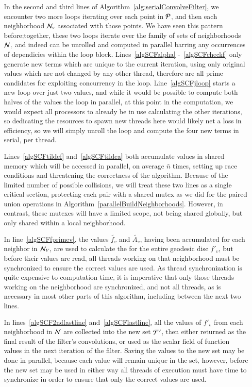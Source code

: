 In the second and third lines of Algorithm~\ref{alg:serialConvolveFilter}, we encounter two more loops iterating over each point in $\mathcal{P}$, and then each neighborhood $\mathcal{N}_v$ associated with those points. We have seen this pattern before;together, these two loops iterate over the family of sets of neighborhoods $\mathcal{N}$, and indeed can be unrolled and computed in parallel barring any occurrences of dependicies within the loop block. Lines~\ref{algSCFalpha} -~\ref{algSCFcheckf} only  generate new terms which are unique to the current iteration, using only original values which are not changed by any other thread, therefore are all prime candidates for exploiting concurrency in the loop. Line~\ref{algSCFjloop} starts a new loop over just two values, and while it would be possible to compute both halves of the values the loop in parallel, at this point in the computation, we would expect all processors to already be in use calculating the other iterations, so dedicating the resources to spawn new threads here would likely net a loss in efficiency, so we will simply unroll the loop and compute the four new terms in serial, per thread.

Lines~\ref{algSCFtildef} and~\ref{algSCFtildea} both accumulate values in shared memory which will be accessed in parallel, on average $\bar{n}$ times, setting up race conditions and threatening the correctness of the algorithm. Because of the limited number of possible collisions, we will treat these two lines as a single critical section, protecting each pair with a shared mutex as we did for the paired union operations in Algorithm~\ref{parallelBuildNeighborhoods}. However, in contrast, these mutexes will have a limited scope, not being shared globally, but only shared within a local neighborhood.

In line~\ref{algSCFfprimev}, the values $\tilde{f_v}$ and $\tilde{A_v}$, having been accumulated for each neighbor in $\mathcal{N}_V$, are used to calculate the \wmfv{} for the entire geodesic disc $f'_v$, but before their values are read, all threads working on that neighborhood must be synchronized to ensure the correct values are used. As thread synchronization is quite expensive to computation time, it is imperative that only those threads working on the neighborhood are synchronized, and not all threads, as is necessary in most other parts of this algorithm, including between the next two lines.

In lines~\ref{algSCF2ndlastline} and~\ref{algSCFlastline}, all the values of $f'_v$ from each neighborhood in $\mathcal{N}$ are collected into the new set $\mathcal{F}'$,  then either returned as the final result of the filter's convolutions, or used as the scalar field of function values in the next iteration of the filter. Saving the values to the new set may be done in parallel, because each value will remain unique in the set, however, before the new set may be used in either way all threads of execution must have time to synchronize in order to ensure that only the correct values are used.


